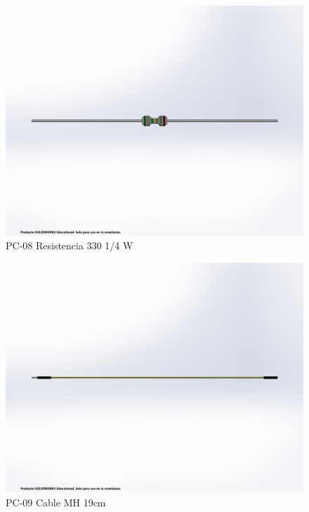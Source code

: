     \begin{figure}[H]
        \centering
        \includegraphics[trim = {1mm 50mm 1mm 50mm},clip,scale=0.2]{3/Img/resistenciaFigura.pdf}
        \caption{PC-08 Resistencia 330 1/4 W}
        \label{fig:resistenciaFigura}
    \end{figure}
    \begin{figure}[H]
        \centering
        \includegraphics[trim = {1mm 50mm 1mm 50mm},clip,scale=0.2]{3/Img/cableMHFigura.pdf}
        \caption{PC-09 Cable MH 19cm}
        \label{fig:cableMHFigura}
    \end{figure}
